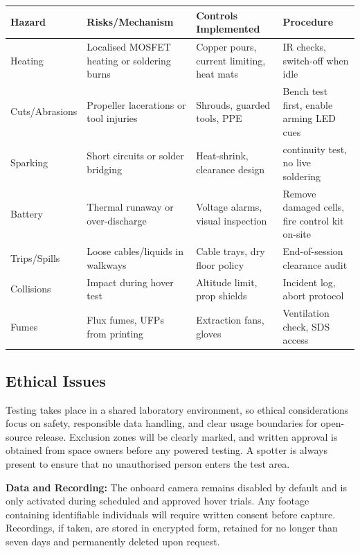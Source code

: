 \begin{tabular}{|p{2.3cm}|p{4.5cm}|p{4cm}|p{3.8cm}|}
\hline
\rowcolor{gray!15}\textbf{Hazard} & \textbf{Risks/Mechanism} & \textbf{Controls Implemented} & \textbf{Procedure} \\ \hline
Heating & Localised MOSFET heating or soldering burns & Copper pours, current limiting, heat mats & IR checks, switch-off when idle \\ \hline
Cuts/Abrasions & Propeller lacerations or tool injuries & Shrouds, guarded tools, PPE & Bench test first, enable arming LED cues \\ \hline
Sparking & Short circuits or solder bridging & Heat-shrink, clearance design & continuity test, no live soldering \\ \hline
Battery & Thermal runaway or over-discharge & Voltage alarms, visual inspection & Remove damaged cells, fire control kit on-site \\ \hline
Trips/Spills & Loose cables/liquids in walkways & Cable trays, dry floor policy & End-of-session clearance audit \\ \hline
Collisions & Impact during hover test & Altitude limit, prop shields & Incident log, abort protocol \\ \hline
Fumes & Flux fumes, UFPs from printing & Extraction fans, gloves & Ventilation check, SDS access \\ \hline
\end{tabular}

\pagebreak
\subsection{Ethical Issues}
Testing takes place in a shared laboratory environment, so ethical considerations focus on safety, responsible data handling, and clear usage boundaries for open-source release. Exclusion zones will be clearly marked, and written approval is obtained from space owners before any powered testing. A spotter is always present to ensure that no unauthorised person enters the test area.

\vspace{0.5em}
\textbf{Data and Recording:}  
The onboard camera remains disabled by default and is only activated during scheduled and approved hover trials. Any footage containing identifiable individuals will require written consent before capture. Recordings, if taken, are stored in encrypted form, retained for no longer than seven days and permanently deleted upon request.


